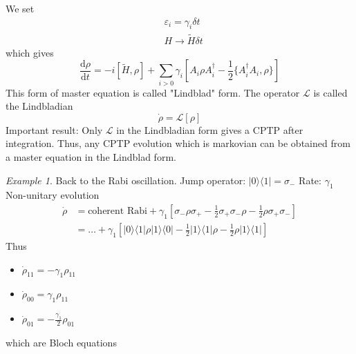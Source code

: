 \documentclass[a4paper]{book}
\theoremstyle{definition}
\theoremstyle{remark}
\newtheorem*{example}{Example}
\begin{document}
We set 
\begin{equation}
    \begin{aligned}
        &\varepsilon_i = \gamma_i \delta t \\ 
        &H \rightarrow \tilde{H}\delta t
    \end{aligned}
\end{equation}
which gives 
\begin{equation}
    \frac{\text{d}\rho}{\text{d}t} = - i[\tilde{H}, \rho] + \sum_{i>0} \gamma_i \left[A_i \rho A_i^\dagger - \frac{1}{2}\{A_i^\dagger A_i, \rho\}\right]
\end{equation}
This form of master equation is called "Lindblad" form. The operator $\mathscr{L}$ is called the Lindbladian
\begin{equation}
    \dot{\rho} = \mathscr{L}[\rho]
\end{equation}
Important result: Only $\mathscr{L}$ in the Lindbladian form gives a CPTP after integration. Thus, any CPTP evolution which is markovian can be obtained from a master equation in the Lindblad form. 
\begin{example}
    Back to the Rabi oscillation. \newline 
    Jump operator: $|0\rangle\langle1| = \sigma_-$\newline 
    Rate: $\gamma_1$\newline 
    Non-unitary evolution 
    \begin{equation}
        \begin{aligned}
            \dot{\rho} &= \text{coherent Rabi} + \gamma_1 [\sigma_- \rho \sigma_+ - \frac{1}{2}\sigma_+\sigma_-\rho - \frac{1}{2}\rho\sigma_+\sigma_-] \\ 
            &= \dots + \gamma_1 \left[|0\rangle\langle1| \rho | 1 \rangle\langle 0| - \frac{1}{2}|1\rangle \langle 1|\rho -\frac{1}{2}\rho|1\rangle \langle 1| \right]
        \end{aligned}
    \end{equation}
Thus 
\begin{itemize}
    \item $\dot{\rho}_{11} = -\gamma_1 \rho_{11}$
    \item $\dot{\rho}_{00} = \gamma_1 \rho_{11}$
    \item $\dot{\rho}_{01} = -\frac{\gamma_1}{2} \rho_{01}$
\end{itemize}
which are Bloch equations
\end{example}
\end{document}
